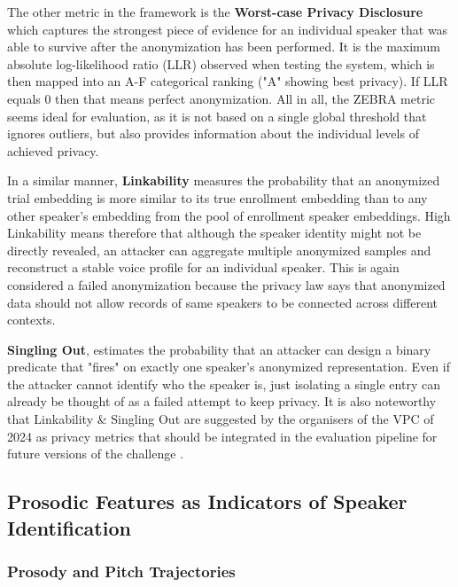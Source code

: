 \documentclass[12pt,leqno,a4paper]{article}
\begin{document}
The other metric in the framework is the \textbf{Worst-case Privacy Disclosure} which captures the strongest piece of evidence for an 
individual speaker that was able to survive after the anonymization has been performed. It is the maximum absolute log-likelihood ratio (LLR) observed
when testing the system, which is then mapped into an A-F categorical ranking ("A" showing best privacy). If LLR equals 0 then that means perfect anonymization. 
All in all, the ZEBRA metric seems ideal for evaluation, as it is not based on a single global threshold that ignores outliers, but also provides information about the individual levels of achieved privacy.

In a similar manner, \textbf{Linkability} measures the probability that an anonymized trial embedding is more similar to its true enrollment embedding than to any other 
speaker’s embedding from the pool of enrollment speaker embeddings. High Linkability means therefore that although the speaker identity might not be 
directly revealed, an attacker can aggregate multiple anonymized samples and reconstruct a stable voice profile for an individual speaker. 
This is again considered a failed anonymization because the privacy law says that anonymized data should not allow records of same speakers to be 
connected across different contexts.

\textbf{Singling Out}, estimates the probability that an attacker can design a binary predicate that "fires" on exactly one speaker’s anonymized 
representation. Even if the attacker cannot identify who the speaker is, just isolating a single entry can already be thought of as a failed attempt 
to keep privacy. It is also noteworthy that Linkability \& Singling Out are suggested by the organisers of the VPC of 2024 as privacy metrics that should be integrated in the evaluation pipeline for future versions of the challenge \citep{tomashenko_third_2026}.

\subsection{Prosodic Features as Indicators of Speaker Identification}

\subsubsection{Prosody and Pitch Trajectories}
\end{document}
